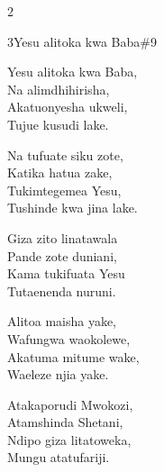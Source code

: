 \begin{multicols}{2}
\begin{hymn}{3}{Yesu alitoka kwa Baba}{\#9}
\begin{stanza}
Yesu alitoka kwa Baba,\\
Na alimdhihirisha,\\
Akatuonyesha ukweli,\\
Tujue kusudi lake.
\end{stanza}
\begin{chorus}
Na tufuate siku zote,\\
Katika hatua zake,\\
Tukimtegemea Yesu,\\
Tushinde kwa jina lake.
\end{chorus}
\begin{stanza}
Giza zito linatawala\\
Pande zote duniani,\\
Kama tukifuata Yesu\\
Tutaenenda nuruni.
\end{stanza}
\begin{stanza}
Alitoa maisha yake,\\
Wafungwa waokolewe,\\
Akatuma mitume wake,\\
Waeleze njia yake.
\end{stanza}
\begin{stanza}
Atakaporudi Mwokozi,\\
Atamshinda Shetani,\\
Ndipo giza litatoweka,\\
Mungu atatufariji.
\end{stanza}
\end{hymn}


\end{multicols}
